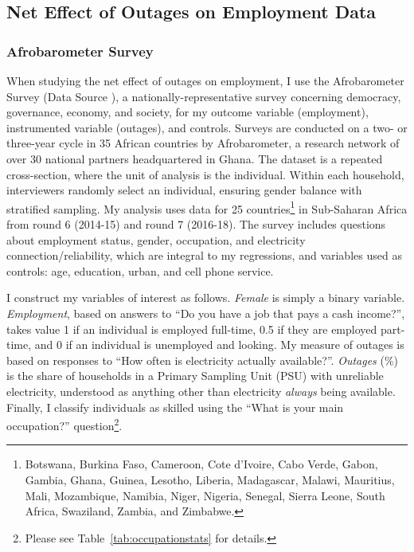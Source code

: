 \documentclass[12pt]{article}
\begin{document}
\subsection{Net Effect of Outages on Employment Data} \label{subsec:nedata}
\subsubsection{Afrobarometer Survey}
When studying the net effect of outages on employment, I use the Afrobarometer Survey (Data Source \cite{afrobarometer}), a nationally-representative survey concerning democracy, governance,
economy, and society, for my outcome variable (employment), instrumented variable (outages), and controls. Surveys are conducted on a two- or three-year cycle in 35 African countries by Afrobarometer, a research network of over 30 national partners headquartered in Ghana. The dataset is a repeated cross-section, where the unit of analysis is the individual. Within each household, interviewers randomly select an individual, ensuring gender balance with stratified sampling. My analysis uses data for 25 countries\footnote{Botswana, Burkina Faso, Cameroon, Cote d’Ivoire, Cabo Verde, Gabon, Gambia, Ghana, Guinea, Lesotho, Liberia, Madagascar, Malawi, Mauritius, Mali, Mozambique, Namibia, Niger, Nigeria, Senegal, Sierra Leone, South Africa, Swaziland, Zambia, and Zimbabwe.} in Sub-Saharan Africa from round 6 (2014-15) and round 7 (2016-18). The survey includes questions about employment status, gender, occupation, and electricity connection/reliability, which are integral to my regressions, and variables used as controls: age, education, urban, and cell phone service. 
\par
I construct my variables of interest as follows. \textit{Female} is simply a binary variable. \textit{Employment}, based on answers to “Do you have a job that pays a cash income?”, takes value 1 if an individual is employed full-time, 0.5 if they are employed part-time, and 0 if an individual is unemployed and looking. My measure of outages is based on responses to “How often is electricity actually available?”. \textit{Outages} (\%) is the share of households in a Primary Sampling Unit (PSU) with unreliable electricity, understood as anything other than electricity \textit{always} being available. Finally, I classify individuals as skilled using the “What is your main occupation?” question\footnote{Please see Table~\ref{tab:occupationstats} for details.}.
\end{document}
